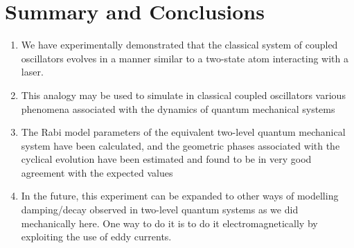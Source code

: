 \chapter{\label{summary}Summary and Conclusions}
\begin{enumerate}
	\item We have experimentally demonstrated that the classical system of coupled oscillators evolves
	in a manner similar to a two-state atom interacting with a laser. 
	\item  This analogy may be used to
	simulate in classical coupled oscillators various phenomena associated with the dynamics of
	quantum mechanical systems
	\item  The Rabi model parameters of the equivalent two-level
	quantum mechanical system have been calculated, and the geometric phases associated with
	the cyclical evolution have been estimated and found to be in very good agreement with the
	expected values
	\item In the future, this experiment can be expanded to other ways of modelling damping/decay observed in two-level quantum systems as we did mechanically here. One way to do it is to do it electromagnetically by exploiting the use of eddy currents.
\end{enumerate}

\setcounter{equation}{0}
\setcounter{table}{0}
\setcounter{figure}{0}


    



